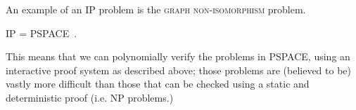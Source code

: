 An example of an IP problem is the \textsc{graph non-isomorphism} problem.

\begin{theorem}
 IP = PSPACE~\cite{ipequalspspace}.
\end{theorem}

This means that we can polynomially verify the problems in PSPACE, using an interactive proof system as described above; those problems are (believed to be) vastly more difficult than those that can be checked using a static and deterministic proof (i.e. NP problems.)


